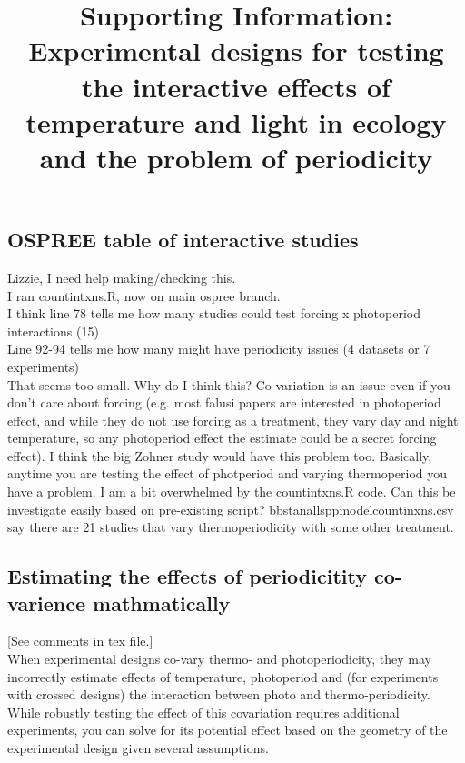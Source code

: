 \documentclass[11pt]{article}
\title{Supporting Information: Experimental designs for testing the interactive effects of temperature and light in ecology and the problem of periodicity }
\begin{document}
\maketitle
\subsection*{OSPREE table of interactive studies}

Lizzie, I need help  making/checking this.\\
I ran countintxns.R, now on main ospree branch.\\
I think line 78 tells me how many studies could test forcing x photoperiod interactions (15)\\
Line 92-94 tells me how many might have periodicity issues (4 datasets or 7 experiments)\\

That seems too small. Why do I think this?  Co-variation is an issue even if you don't care about forcing (e.g. most falusi papers are interested in photoperiod effect, and while they do not use forcing as a treatment, they vary day and night temperature, so any photoperiod effect the estimate could be a secret forcing effect). I think the big Zohner study would have this problem too. Basically, anytime you are testing the effect of photperiod and varying thermoperiod you have a problem. I am a bit overwhelmed by the countintxns.R code. Can this be investigate easily based on pre-existing script? bbstanallsppmodelcountinxns.csv say there are 21 studies that vary thermoperiodicity with some other treatment.

\subsection*{Estimating the effects of periodicitity co-varience mathmatically}
[See comments in tex file.] \\
When experimental designs co-vary thermo- and photoperiodicity, they may incorrectly estimate effects of temperature, photoperiod and (for experiments with crossed designs) the interaction between photo and thermo-periodicity. While robustly testing the effect of this covariation requires additional experiments, you can solve for its potential effect based on the geometry of the experimental design given several assumptions.\\
\end{document}
